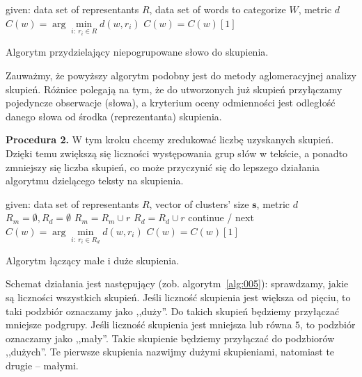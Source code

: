 \documentclass{praca1}
\begin{document}
\begin{algorithm}[h!]
\begin{algorithmic}[1]
		\State given: data set of representants $R$, data set of words to categorize $W$, metric $d$
            \State $C(w) = \arg \min\limits_{i:\ r_i \in R} d(w,r_i)$
            	\State $C(w) = C(w)[1]$
            \EndIf
       \EndFor
\end{algorithmic}
\caption{Algorytm przydzielający niepogrupowane słowo do skupienia.}\label{alg:004}
\end{algorithm}

Zauważmy, że powyższy algorytm podobny jest do metody aglomeracyjnej analizy skupień. Różnice polegają na tym, że do utworzonych już skupień przyłączamy pojedyncze obserwacje (słowa), a kryterium oceny odmienności jest odległość danego słowa od środka (reprezentanta) skupienia.

\textbf{Procedura 2.} W tym kroku chcemy zredukować liczbę uzyskanych skupień. Dzięki temu zwiększą się liczności występowania grup słów w tekście, a ponadto zmniejszy się liczba skupień, co może przyczynić się do lepszego działania algorytmu dzielącego teksty na skupienia.

\begin{algorithm}[h!]
\begin{algorithmic}[1]
		\State given: data set of representants $R$, vector of clusters' size $\mathbf{s}$, metric $d$
		\State $R_m = \emptyset, R_d = \emptyset$
				\State $R_m = R_m \cup r$
			\Else
				\State $R_d = R_d \cup r$
			\EndIf
		\EndFor
        		\State continue / next
        	\EndIf
            \State $C(w) = \arg\min\limits_{i:\ r_i \in R_d} d(w,r_i)$
            	\State $C(w) = C(w)[1]$
            \EndIf
       \EndFor
\end{algorithmic}
\caption{Algorytm łączący małe i duże skupienia.}\label{alg:005}
\end{algorithm}

Schemat działania jest następujący (zob. algorytm~\ref{alg:005}): sprawdzamy, jakie są liczności wszystkich skupień. Jeśli liczność skupienia jest większa od pięciu, to taki podzbiór oznaczamy jako ,,duży''. Do takich skupień będziemy przyłączać mniejsze podgrupy. Jeśli liczność skupienia jest mniejsza lub równa $5$, to podzbiór oznaczamy jako ,,mały''. Takie skupienie będziemy przyłączać do podzbiorów ,,dużych''. Te pierwsze skupienia nazwijmy dużymi skupieniami, natomiast te drugie -- małymi. 
\end{document}
